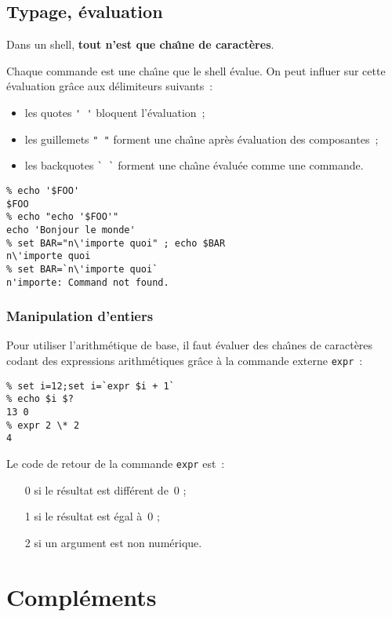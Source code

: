 \subsection{Typage, \'evaluation}%
\begin{frame}[fragile]
  Dans un shell, \textbf{tout n'est que cha\^\i{}ne de caract\`eres}.
  \par\smallskip
  Chaque commande est une cha\^\i{}ne que le shell \'evalue. On peut
  influer sur cette \'evaluation gr\^ace aux d\'elimiteurs suivants~:
  \begin{itemize}
  \item les quotes \verb?' '? bloquent l'\'evaluation~;
  \item les guillemets \verb?" "? forment une cha\^\i{}ne apr\`es
    \'evaluation des composantes~;
  \item les backquotes \verb?` `? forment une cha\^\i{}ne \'evalu\'ee
    comme une commande.
  \end{itemize}
\begin{verbatim}
% echo '$FOO'
$FOO
% echo "echo '$FOO'"
echo 'Bonjour le monde'
% set BAR="n\'importe quoi" ; echo $BAR
n\'importe quoi
% set BAR=`n\'importe quoi`
n'importe: Command not found.                
\end{verbatim}
\end{frame}
\begin{frame}[fragile]
  \frametitle{Manipulation d'entiers}%
  Pour utiliser l'arithm\'etique de base, il faut \'evaluer des
  cha\^\i{}nes de caract\`eres codant des expressions arithm\'etiques
  gr\^ace \`a la commande externe \texttt{expr}~:
\begin{verbatim}
% set i=12;set i=`expr $i + 1`
% echo $i $?
13 0
% expr 2 \* 2
4
\end{verbatim}
  Le code de retour de la commande \verb|expr| est~:
  \begin{itemize}
  \item[0] si le r\'esultat est diff\'erent de~$0$ ;
  \item[1] si le r\'esultat est \'egal \`a~$0$ ;
  \item[2] si un argument est non num\'erique.
  \end{itemize}
\end{frame}
\section{Compl\'ements} 
